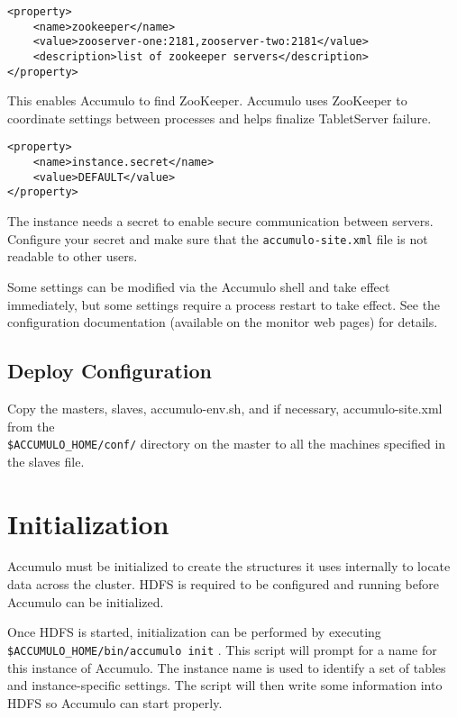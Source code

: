 \small
\begin{verbatim}
<property>
    <name>zookeeper</name>
    <value>zooserver-one:2181,zooserver-two:2181</value>
    <description>list of zookeeper servers</description>
</property>
\end{verbatim}
\normalsize

This enables Accumulo to find ZooKeeper. Accumulo uses ZooKeeper to coordinate
settings between processes and helps finalize TabletServer failure.


\small
\begin{verbatim}
<property>
    <name>instance.secret</name>
    <value>DEFAULT</value>
</property>
\end{verbatim}
\normalsize

The instance needs a secret to enable secure communication between servers. Configure your
secret and make sure that the \texttt{accumulo-site.xml} file is not readable to other users.

Some settings can be modified via the Accumulo shell and take effect immediately, but
some settings require a process restart to take effect. See the configuration documentation
(available on the monitor web pages) for details.

\subsection{Deploy Configuration}

Copy the masters, slaves, accumulo-env.sh, and if necessary, accumulo-site.xml
from the\\\texttt{\$ACCUMULO\_HOME/conf/} directory on the master to all the machines
specified in the slaves file.

\section{Initialization}

Accumulo must be initialized to create the structures it uses internally to locate
data across the cluster. HDFS is required to be configured and running before
Accumulo can be initialized.

Once HDFS is started, initialization can be performed by executing\\
\texttt{\$ACCUMULO\_HOME/bin/accumulo init} . This script will prompt for a name
for this instance of Accumulo. The instance name is used to identify a set of tables
and instance-specific settings. The script will then write some information into
HDFS so Accumulo can start properly.

